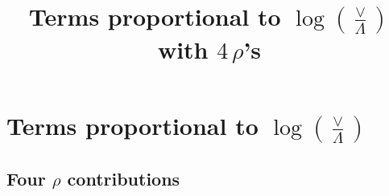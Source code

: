 \documentclass[aps,prd,amsmath,amssymb,nofootinbib]{revtex4-2}
\title{Terms proportional to $\log{\left(\frac{\vee}{\Lambda}\right)}$ with $4\, \rho$'s}
\numberwithin{equation}{section}
\begin{document}
\section{Terms proportional to $\log{\left(\frac{\vee}{\Lambda}\right)}$}
\subsection{Four $\rho$ contributions}
\end{document}
